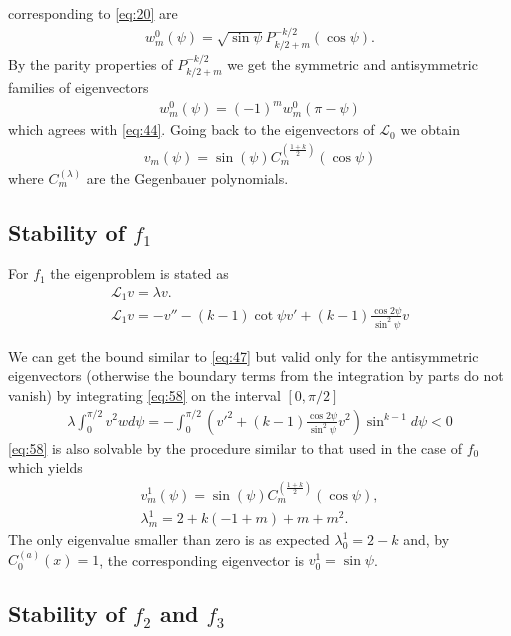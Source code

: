 corresponding to \eqref{eq:20} are
\begin{align}
  \label{eq:55}
  w_m^0(\psi)=\sqrt{\sin\psi}P_{k/2+m}^{-k/2}(\cos\psi).
\end{align}
By the parity properties of $P_{k/2+m}^{-k/2}$ we get the symmetric
and antisymmetric families of eigenvectors
\begin{align}
  \label{eq:56}
  w_m^0(\psi)=(-1)^m w_m^0(\pi-\psi)
\end{align}
which agrees with \eqref{eq:44}. Going back to the eigenvectors of
$\mathcal{L}_0$ we obtain
\begin{align}
  \label{eq:57}
  v_m(\psi)=\sin(\psi)C^{\left(\frac{1+k}{2}\right)}_m(\cos\psi)
\end{align}
where $C^{(\lambda)}_m$ are the Gegenbauer polynomials.

\subsection{Stability of $f_1$}
\label{sec:stability-f_1}

For $f_1$ the eigenproblem is stated as
\begin{align}
  \label{eq:58}
  \mathcal{L}_1 v = \lambda v. \\
  \label{eq:59}
  \mathcal{L}_1 v = -v''-(k-1)\cot\psi v'+(k-1)\frac{\cos2\psi}{\sin^2\psi}v
\end{align}

We can get the bound similar to \eqref{eq:47} but valid only for the
antisymmetric eigenvectors (otherwise the boundary terms from the
integration by parts do not vanish) by integrating \eqref{eq:58} on
the interval $[0,\pi/2]$
\begin{align}
  \label{eq:f1_lambda}
  \lambda\int_0^{\pi/2} v^2w
  d\psi=-\int_0^{\pi/2}\left(v'^2+(k-1)\frac{\cos2\psi}{\sin^2\psi}v^2\right)\sin^{k-1}d\psi<0
\end{align}
\eqref{eq:58} is also solvable by the procedure similar to that used
in the case of $f_0$ which yields
\begin{align}
  \label{eq:60}
  v_m^1(\psi)=\sin(\psi)C^{\left(\frac{1+k}{2}\right)}_m(\cos\psi), \\
  \label{eq:61}
  \lambda_m^1=2 + k (-1 + m) + m + m^2.
\end{align}
The only eigenvalue smaller than zero is as expected $\lambda_0^1=2-k$
and, by $C^{(a)}_0(x)=1$, the corresponding eigenvector is
$v_0^1=\sin\psi$.

\subsection{Stability of $f_2$ and $f_3$}
\label{sec:stability-f_2-f_3}

